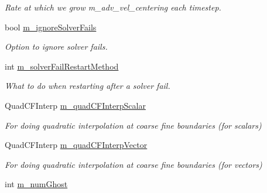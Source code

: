 \begin{DoxyCompactItemize}
\begin{DoxyCompactList}\small\item\em Rate at which we grow m\-\_\-adv\-\_\-vel\-\_\-centering each timestep. \end{DoxyCompactList}\item 
bool \hyperlink{class_a_m_r_level_mushy_layer_a7ddfec87b90ab2887546165b5ca7196b}{m\-\_\-ignore\-Solver\-Fails}
\begin{DoxyCompactList}\small\item\em Option to ignore solver fails. \end{DoxyCompactList}\item 
\hypertarget{class_a_m_r_level_mushy_layer_a8deec9976a07239f71a6efc88e579d53}{int \hyperlink{class_a_m_r_level_mushy_layer_a8deec9976a07239f71a6efc88e579d53}{m\-\_\-solver\-Fail\-Restart\-Method}}\label{class_a_m_r_level_mushy_layer_a8deec9976a07239f71a6efc88e579d53}

\begin{DoxyCompactList}\small\item\em What to do when restarting after a solver fail. \end{DoxyCompactList}\item 
\hypertarget{class_a_m_r_level_mushy_layer_aef47162bc24ba3eccffb5f7319c4d19d}{Quad\-C\-F\-Interp \hyperlink{class_a_m_r_level_mushy_layer_aef47162bc24ba3eccffb5f7319c4d19d}{m\-\_\-quad\-C\-F\-Interp\-Scalar}}\label{class_a_m_r_level_mushy_layer_aef47162bc24ba3eccffb5f7319c4d19d}

\begin{DoxyCompactList}\small\item\em For doing quadratic interpolation at coarse fine boundaries (for scalars) \end{DoxyCompactList}\item 
\hypertarget{class_a_m_r_level_mushy_layer_a95cbb370eeaed9cd89e03dbf57d69988}{Quad\-C\-F\-Interp \hyperlink{class_a_m_r_level_mushy_layer_a95cbb370eeaed9cd89e03dbf57d69988}{m\-\_\-quad\-C\-F\-Interp\-Vector}}\label{class_a_m_r_level_mushy_layer_a95cbb370eeaed9cd89e03dbf57d69988}

\begin{DoxyCompactList}\small\item\em For doing quadratic interpolation at coarse fine boundaries (for vectors) \end{DoxyCompactList}\item 
\hypertarget{class_a_m_r_level_mushy_layer_aba35ef990a5a51e81af28856f9bfd095}{int \hyperlink{class_a_m_r_level_mushy_layer_aba35ef990a5a51e81af28856f9bfd095}{m\-\_\-num\-Ghost}}\label{class_a_m_r_level_mushy_layer_aba35ef990a5a51e81af28856f9bfd095}


\end{DoxyCompactItemize}
